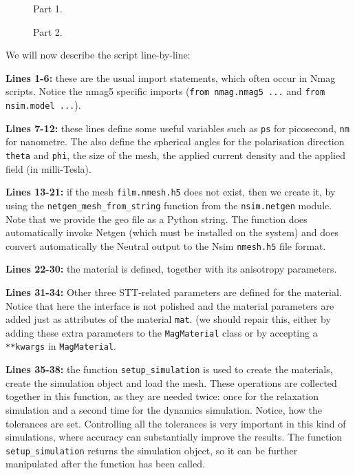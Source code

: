 \documentclass[11pt,oneside,openany]{article}
\begin{document}
\begin{figure}[!p]

\caption{Part 1.}
\label{fig:script1of2}
\end{figure}

\begin{figure}[!h]

\caption{Part 2.}
\label{fig:script2of2}
\end{figure}

We will now describe the script line-by-line:

\textbf{Lines 1-6:} these are the usual import statements, which often occur
in Nmag scripts. Notice the nmag5 specific imports (\verb|from nmag.nmag5 ...|
and \verb|from nsim.model ...|).

\textbf{Lines 7-12:} these lines define some useful variables such as
\verb|ps| for picosecond, \verb|nm| for nanometre.  The also define the
spherical angles for the polarisation direction \verb|theta| and \verb|phi|,
the size of the mesh, the applied current density and the applied field
(in milli-Tesla).

\textbf{Lines 13-21:} if the mesh \verb|film.nmesh.h5| does not exist, then
we create it, by using the \verb|netgen_mesh_from_string| function from the
\verb|nsim.netgen| module. Note that we provide the geo file as a Python
string. The function does automatically invoke Netgen (which must be installed
on the system) and does convert automatically the Neutral output to the
Nsim \verb|nmesh.h5| file format.

\textbf{Lines 22-30:} the material is defined, together with its anisotropy
parameters.

\textbf{Lines 31-34:} Other three STT-related parameters are defined for the
material. Notice that here the interface is not polished and the material
parameters are added just as attributes of the material \verb|mat|. (we should
repair this, either by adding these extra parameters to the \verb|MagMaterial|
class or by accepting a \verb|**kwargs| in \verb|MagMaterial|.

\textbf{Lines 35-38:} the function \verb|setup_simulation| is used to create
the materials, create the simulation object and load the mesh. These operations
are collected together in this function, as they are needed twice: once for the
relaxation simulation and a second time for the dynamics simulation.  Notice,
how the tolerances are set. Controlling all the tolerances is very important in
this kind of simulations, where accuracy can substantially improve the
results. The function \verb|setup_simulation| returns the simulation object, so
it can be further manipulated after the function has been called.
\end{document}
